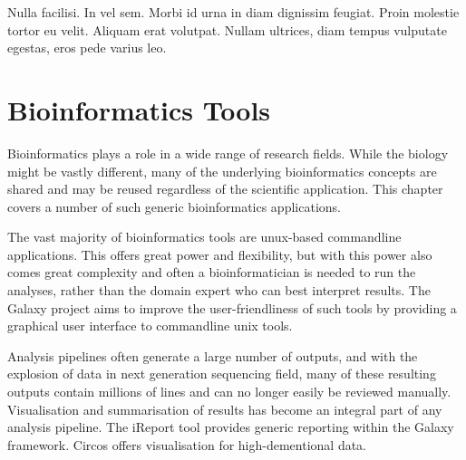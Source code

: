 \begin{savequote}[75mm]
Nulla facilisi. In vel sem. Morbi id urna in diam dignissim feugiat. Proin molestie tortor eu velit. Aliquam erat volutpat. Nullam ultrices, diam tempus vulputate egestas, eros pede varius leo.
\end{savequote}

\chapter{Bioinformatics Tools}
\label{chapter:general}
\setcounter{figure}{-1}
\setcounter{table}{-1}
\setcounter{section}{-1}
\setcounter{NAT@ctr}{-1}

\begin{comment}
iReport, Circos?, myFAIR?, Galaxy2018update? (I am co-author and technically everybody is
shared first on that? would fit nicely with the overall story as every other paper connects
to Galaxy.)
- Training paper in its own section or add it here?
\end{comment}

Bioinformatics plays a role in a wide range of research fields. While the biology might be vastly different, many of the underlying bioinformatics concepts are shared and may be reused regardless of the scientific application. This chapter covers a number of such generic bioinformatics applications.

The vast majority of bioinformatics tools are unux-based commandline applications. This offers great power and flexibility, but with this power also comes great complexity and often a bioinformatician is needed to run the analyses, rather than the domain expert who can best interpret results. The Galaxy project aims to improve the user-friendliness of such tools by providing a graphical user interface to commandline unix tools.

Analysis pipelines often generate a large number of outputs, and with the explosion of data in next generation sequencing field, many of these resulting outputs contain millions of lines and can no longer easily be reviewed manually. Visualisation and summarisation of results has become an integral part of any analysis pipeline. The iReport tool provides generic reporting within the Galaxy framework. Circos offers visualisation for high-dementional data.

\begin{comment}
Contents of this chapter:
\begin{enumerate}
\itemsep-0.5em
\item The Galaxy platform for accessible, reprodu- cible and collaborative biomedical analyses: 2018 update
\item iReport: A generalised Galaxy solution for integrated experimental reporting
\item Galactic Circos: Visualisation of high-dimensional data in Galaxy
\end{enumerate}
\end{comment}
